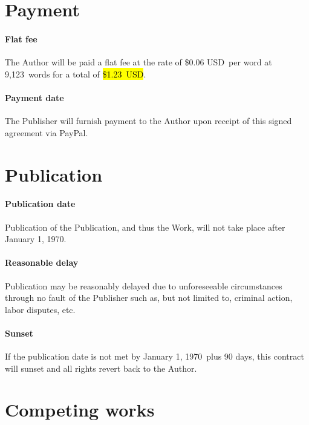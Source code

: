 \documentclass[12pt,letterpaper,oneside]{article}
\def\WordCount{9,123}
\def\Fee{\$1.23 USD}
\def\Rate{\$0.06 USD}
\def\PaymentMechanism{PayPal} %
\def\PublicationDate{January 1, 1970}
\begin{document}
\section{Payment}

\paragraph{Flat fee}

The Author will be paid a flat fee at the rate of \Rate\ per word at \WordCount\ words for a total of \hl{\mbox{\Fee}}.

\paragraph{Payment date}

The Publisher will furnish payment to the Author upon receipt of this signed agreement via \PaymentMechanism.

\section{Publication}

\paragraph{Publication date}

Publication of the Publication, and thus the Work, will not take place after \PublicationDate.

\paragraph{Reasonable delay}

Publication may be reasonably delayed due to unforeseeable circumstances through no fault of the Publisher such as, but not limited to, criminal action, labor disputes, etc.

\paragraph{Sunset}

If the publication date is not met by \PublicationDate\ plus 90 days, this contract will sunset and all rights revert back to the Author.

\section{Competing works}
\end{document}
